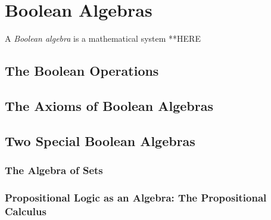 \section{Boolean Algebras}
\label{sec:Boolean-Algebra}

A {\it Boolean algebra} is a mathematical system **HERE

\subsection{The Boolean Operations}
\label{sec:Boolean-Ops}


\subsection{The Axioms of Boolean Algebras}
\label{sec:Boolean-Axioms}


\subsection{Two Special Boolean Algebras}

\subsubsection{The Algebra of Sets}
\label{sec:Boolean-Algebra-Sets}

\subsubsection{Propositional Logic as an Algebra: The Propositional
  Calculus}

